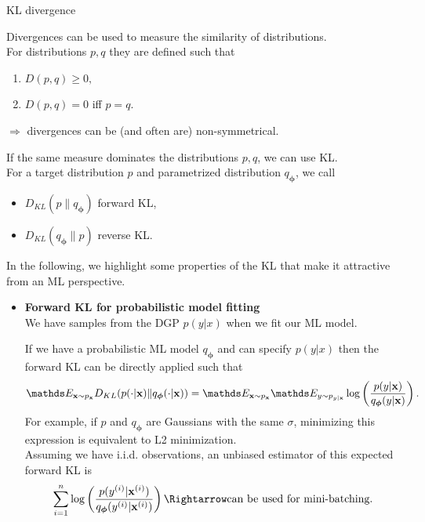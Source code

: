 \documentclass[11pt,compress,t,notes=noshow, xcolor=table]{beamer}
\begin{document}
\begin{vbframe}{KL divergence}

Divergences can be used to measure the similarity of distributions.\\
\lz For distributions $p, q$ they are defined such that
\begin{enumerate}
    \item $D(p, q) \geq 0,$
    \item $D(p, q) = 0$ iff $p = q.$
\end{enumerate}
$\Rightarrow$ divergences can be (and often are) non-symmetrical. \\
 \lz
 
If the same measure dominates the distributions $p,q$, we can use KL. \\
For a target distribution $p$ and parametrized distribution $q_{\bm{\phi}}$, we call
\begin{itemize}
    \item $D_{KL}(p \| q_{\bm{\phi}})$ forward KL,
    \item $D_{KL}(q_{\bm{\phi}} \| p)$ reverse KL.
\end{itemize}
\lz
In the following, we highlight some properties of the KL that make it attractive from an ML perspective.

\framebreak

\begin{itemize}
    \item \textbf{Forward KL for probabilistic model fitting}
    \\ We have samples from the DGP $p(y|x)$ when we fit our ML model.
    \\
    \lz
    
    If we have a probabilistic ML model $q_{\bm{\phi}}$ and can specify $p(y|x)$ then the forward KL can be directly applied such that
    $$\E_{\xv \sim p_{\xv}}D_{KL}(p(\cdot|\xv) \| q_{\bm{\phi}}(\cdot|\xv)) = \E_{\xv \sim p_{\xv}}\E_{y \sim p_{y|\xv}}\log\left(\frac{p(y|\xv)}{q_{\bm{\phi}}(y|\xv)}\right).$$
For example, if $p$ and $q_{\bm{\phi}}$ are Gaussians with the same $\sigma$, minimizing this expression is equivalent to L2 minimization. \\
\lz 
Assuming we have i.i.d. observations, an unbiased estimator of this expected forward KL is
$$\sumin \log\left(\frac{p(\yi|\xi)}{q_{\bm{\phi}}(\yi|\xi)}\right) \Rightarrow \text{can be used for mini-batching.} $$


\end{itemize}
\end{vbframe}
\end{document}

